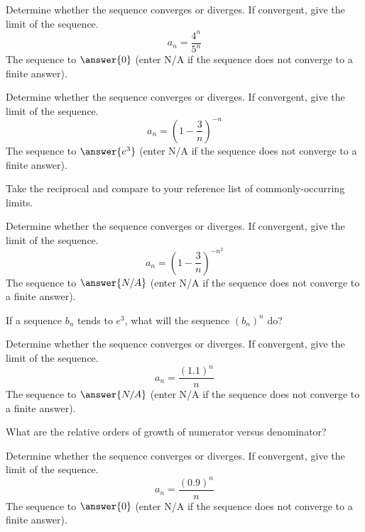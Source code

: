 \documentclass{ximera}
\begin{document}
\begin{exercise}%
Determine whether the sequence converges or diverges. If convergent, give the limit of the sequence. 
\[ a_n = \frac{4^n}{5^n} \]
The sequence  to $\answer{0}$ (enter N/A if the sequence does not converge to a finite answer).
\end{exercise}

\begin{exercise}
Determine whether the sequence converges or diverges. If convergent, give the limit of the sequence. 
\[ a_n = \left(1 - \frac{3}{n} \right)^{-n} \]
The sequence  to $\answer{e^3}$ (enter N/A if the sequence does not converge to a finite answer).
\begin{hint}
Take the reciprocal and compare to your reference list of commonly-occurring limits.
\end{hint}
\end{exercise}

\begin{exercise}
Determine whether the sequence converges or diverges. If convergent, give the limit of the sequence. 
\[ a_n = \left(1 - \frac{3}{n}\right)^{-n^2} \]
The sequence  to $\answer{N/A}$ (enter N/A if the sequence does not converge to a finite answer).
\begin{hint}
If a sequence $b_n$ tends to $e^3$, what will the sequence $(b_n)^n$ do?
\end{hint}
\end{exercise}

\begin{exercise}
Determine whether the sequence converges or diverges. If convergent, give the limit of the sequence. 
\[ a_n = \frac{(1.1)^n}{n} \]
The sequence  to $\answer{N/A}$ (enter N/A if the sequence does not converge to a finite answer).
\begin{hint}
What are the relative orders of growth of numerator versus denominator?
\end{hint}
\end{exercise}

\begin{exercise}
Determine whether the sequence converges or diverges. If convergent, give the limit of the sequence. 
\[ a_n = \frac{(0.9)^n}{n} \]
The sequence  to $\answer{0}$ (enter N/A if the sequence does not converge to a finite answer).
\end{exercise}
\end{document}
